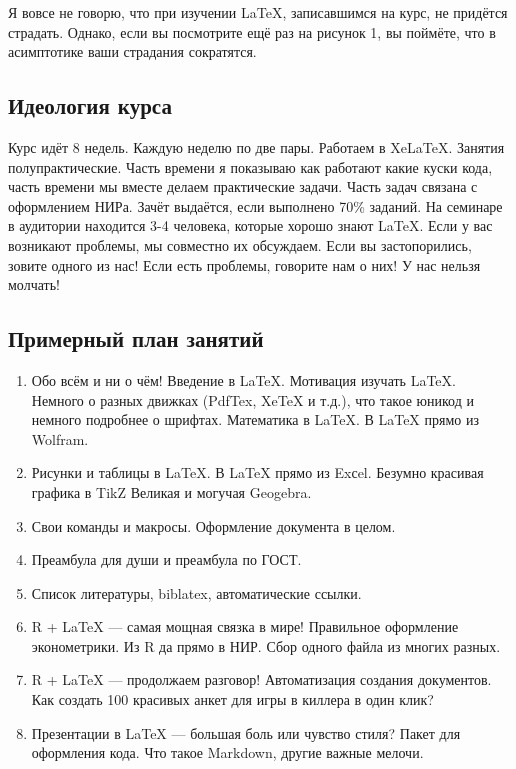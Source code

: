 \documentclass[12pt, a4paper, oneside]{article}
\begin{document}
Я вовсе не говорю, что при изучении \LaTeX{}, записавшимся на курс, не придётся страдать. Однако, если вы посмотрите ещё раз на рисунок  1, вы поймёте, что в асимптотике ваши страдания сократятся. 

\subsection*{Идеология курса}

Курс идёт 8 недель.  Каждую неделю по две пары. Работаем в Xe\LaTeX{}.   Занятия полупрактические. Часть времени я показываю как работают какие куски кода, часть времени мы вместе делаем практические задачи. Часть задач связана с оформлением НИРа. Зачёт выдаётся, если выполнено 70\% заданий. На семинаре в аудитории находится 3-4 человека, которые хорошо знают \LaTeX{}. Если у вас возникают проблемы, мы совместно их обсуждаем. Если вы застопорились, зовите одного из нас! Если есть проблемы, говорите нам о них! У нас нельзя молчать! 

\subsection*{Примерный план занятий} 
 
 \begin{enumerate}
 	\item Обо всём и ни о чём!  Введение в \LaTeX{}.  Мотивация изучать \LaTeX{}. Немного о разных движках (PdfTex, XeTeX и т.д.), что такое юникод и немного подробнее о шрифтах. Математика в \LaTeX{}. В \LaTeX{ } прямо из Wolfram. 
 	\item Рисунки и таблицы в \LaTeX{}. В \LaTeX{ } прямо из Exсel. Безумно красивая графика в TikZ Великая и могучая Geogebra.
 	\item Свои команды и макросы. Оформление документа в целом.
 	\item Преамбула для души и преамбула по ГОСТ.
 	\item Список литературы, biblatex, автоматические ссылки.
 	\item R + \LaTeX{} --- самая мощная связка в мире! Правильное оформление эконометрики. Из R да прямо в НИР. Сбор одного файла из многих разных. 
 	\item R + \LaTeX{} --- продолжаем разговор! Автоматизация создания документов. Как создать 100 красивых анкет для игры в киллера в один клик?
 	\item Презентации в \LaTeX{} --- большая боль или чувство стиля?  Пакет для оформления кода. Что такое Markdown, другие важные мелочи.
  \end{enumerate}
 
\end{document}
